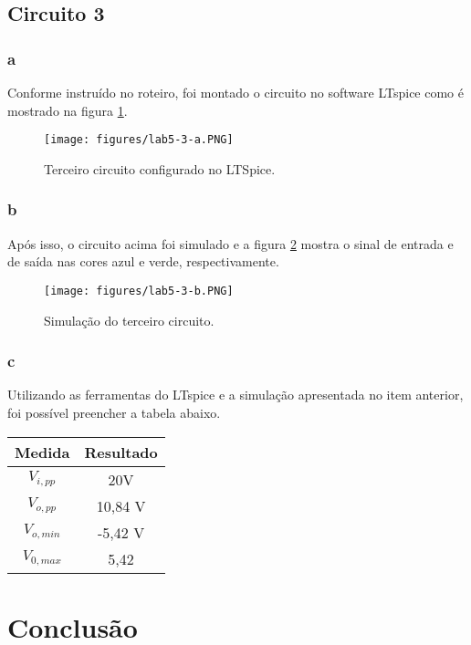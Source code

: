 \documentclass[a4paper]{report}
\begin{document}
\subsection*{Circuito 3}
\subsubsection*{a}
Conforme instruído no roteiro, foi montado o circuito no software LTspice como é mostrado na figura \ref{fig:figures-lab5-3-a-png}.

\begin{figure}[H]
    \centering
    \texttt{[image: figures/lab5-3-a.PNG]}
    \caption{Terceiro circuito configurado no LTSpice.}
    \label{fig:figures-lab5-3-a-png}
\end{figure}

\subsubsection*{b}

Após isso, o circuito acima foi simulado e a figura \ref{fig:figures-lab5-3-b-png} mostra o sinal de entrada e de saída nas cores azul e verde, respectivamente.

\begin{figure}[H]
    \centering
    \texttt{[image: figures/lab5-3-b.PNG]}
    \caption{Simulação do terceiro circuito.}
    \label{fig:figures-lab5-3-b-png}
\end{figure}

\subsubsection*{c}

Utilizando as ferramentas do LTspice e a simulação apresentada no item anterior, foi possível preencher a tabela abaixo.

\begin{table}[H]
    \centering
    \begin{tabular}{c | c}
	Medida & Resultado \\
	\hline
	$V_{i,pp}$ & 20V \\
	$V_{o,pp}$ & 10,84 V \\
	$V_{o,min}$ & -5,42 V \\
	$V_{0,max}$ & 5,42
\end{tabular}
\end{table}

\section{Conclusão}
\end{document}
